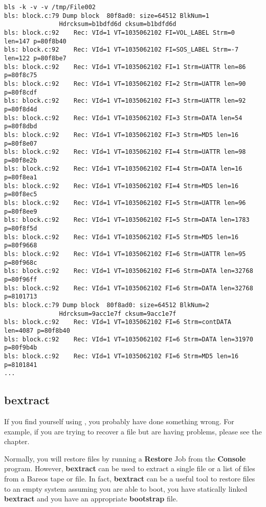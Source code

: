 \footnotesize
\begin{verbatim}
bls -k -v -v /tmp/File002
bls: block.c:79 Dump block  80f8ad0: size=64512 BlkNum=1
               Hdrcksum=b1bdfd6d cksum=b1bdfd6d
bls: block.c:92    Rec: VId=1 VT=1035062102 FI=VOL_LABEL Strm=0 len=147 p=80f8b40
bls: block.c:92    Rec: VId=1 VT=1035062102 FI=SOS_LABEL Strm=-7 len=122 p=80f8be7
bls: block.c:92    Rec: VId=1 VT=1035062102 FI=1 Strm=UATTR len=86 p=80f8c75
bls: block.c:92    Rec: VId=1 VT=1035062102 FI=2 Strm=UATTR len=90 p=80f8cdf
bls: block.c:92    Rec: VId=1 VT=1035062102 FI=3 Strm=UATTR len=92 p=80f8d4d
bls: block.c:92    Rec: VId=1 VT=1035062102 FI=3 Strm=DATA len=54 p=80f8dbd
bls: block.c:92    Rec: VId=1 VT=1035062102 FI=3 Strm=MD5 len=16 p=80f8e07
bls: block.c:92    Rec: VId=1 VT=1035062102 FI=4 Strm=UATTR len=98 p=80f8e2b
bls: block.c:92    Rec: VId=1 VT=1035062102 FI=4 Strm=DATA len=16 p=80f8ea1
bls: block.c:92    Rec: VId=1 VT=1035062102 FI=4 Strm=MD5 len=16 p=80f8ec5
bls: block.c:92    Rec: VId=1 VT=1035062102 FI=5 Strm=UATTR len=96 p=80f8ee9
bls: block.c:92    Rec: VId=1 VT=1035062102 FI=5 Strm=DATA len=1783 p=80f8f5d
bls: block.c:92    Rec: VId=1 VT=1035062102 FI=5 Strm=MD5 len=16 p=80f9668
bls: block.c:92    Rec: VId=1 VT=1035062102 FI=6 Strm=UATTR len=95 p=80f968c
bls: block.c:92    Rec: VId=1 VT=1035062102 FI=6 Strm=DATA len=32768 p=80f96ff
bls: block.c:92    Rec: VId=1 VT=1035062102 FI=6 Strm=DATA len=32768 p=8101713
bls: block.c:79 Dump block  80f8ad0: size=64512 BlkNum=2
               Hdrcksum=9acc1e7f cksum=9acc1e7f
bls: block.c:92    Rec: VId=1 VT=1035062102 FI=6 Strm=contDATA len=4087 p=80f8b40
bls: block.c:92    Rec: VId=1 VT=1035062102 FI=6 Strm=DATA len=31970 p=80f9b4b
bls: block.c:92    Rec: VId=1 VT=1035062102 FI=6 Strm=MD5 len=16 p=8101841
...
\end{verbatim}
\normalsize

\subsection{bextract}
\label{bextract}


If you find yourself using , you probably have done
something wrong. For example, if you are trying to recover a file
but are having problems, please see the  chapter.

Normally, you will restore files by running a {\bf Restore} Job from the {\bf
Console} program. However, {\bf bextract} can be used to extract a single file
or a list of files from a Bareos tape or file. In fact, {\bf bextract} can be
a useful tool to restore files to an empty system assuming you are able to
boot, you have statically linked {\bf bextract} and you have an appropriate
{\bf bootstrap} file.

